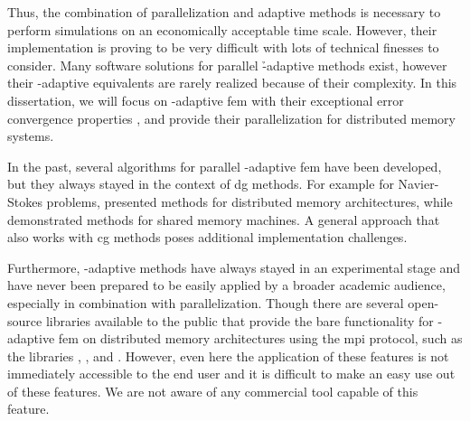 
Thus, the combination of parallelization and adaptive methods is necessary to perform simulations on an economically acceptable time scale. However, their implementation is proving to be very difficult with lots of technical finesses to consider.
Many software solutions for parallel \h-adaptive methods exist, however their \hp-adaptive equivalents are rarely realized because of their complexity.
In this dissertation, we will focus on \hp-adaptive \gls{fem} with their exceptional error convergence properties \parencite{guo1986,babuska1996}, and provide their parallelization for distributed memory systems.



In the past, several algorithms for parallel \hp-adaptive \gls{fem} have been developed, but they always stayed in the context of \gls{dg} methods. For example for Navier-Stokes problems, \textcites{paszynski2006}{chalmers2019} presented methods for distributed memory architectures, while \textcites{paszynski2011}{jomo2017} demonstrated methods for shared memory machines. A general approach that also works with \gls{cg} methods poses additional implementation challenges. %


Furthermore, \hp-adaptive methods have always stayed in an experimental stage and have never been prepared to be easily applied by a broader academic audience, especially in combination with parallelization.
Though there are several open-source libraries available to the public that provide the bare functionality for \hp-adaptive \gls{fem} on distributed memory architectures using the \gls{mpi} protocol, such as the libraries \phaml{} \parencite{mitchell2002,phaml1200}, \phg{} \parencite{zhanglin-bo2019,phg094}, and \mofem{} \parencite{kaczmarczyk2020,mofem090}. However, even here the application of these features is not immediately accessible to the end user and it is difficult to make an easy use out of these features. We are not aware of any commercial tool capable of this feature.

